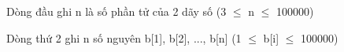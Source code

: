 Dòng đầu ghi n là số phần tử của 2 dãy số (3  $\le$  n  $\le$  100000)  

   Dòng thứ 2 ghi n số nguyên b[1], b[2], ..., b[n] (1  $\le$  b[i]  $\le$  100000)
